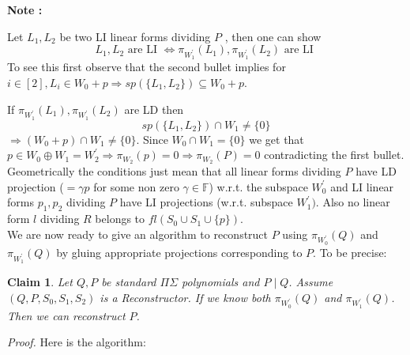 \documentclass[letterpaper,USenglish,numberwithinsect]{lipics}
\newcommand{\F}{\mathbb{F}}
\newtheorem{claim}[theorem]{Claim}
\begin{document}
{\bf Note :}

 Let $L_1,L_2$  be two LI linear forms dividing $P$ , then one can show
 \[
 L_1,L_2 \text{ are LI } \Leftrightarrow \pi_{W_1^\prime}(L_1),
\pi_{W_1^\prime}(L_2) \text{ are LI }
 \]
 To see this first observe that the second bullet implies for $i\in [2], L_i\in W_0 + p \Rightarrow
sp(\{L_1,L_2\})\subseteq W_0+p$.

 If $\pi_{W_1^\prime}(L_1), \pi_{W_1^\prime}(L_2)$ are LD then
 \[
 sp(\{L_1,L_2\}) \cap W_1 \neq \{0\}
  \]
 $\Rightarrow (W_0+p) \cap W_1 \neq \{0\}$. Since $W_0\cap W_1 = \{0\}$ we get
that $p\in W_0\oplus W_1 = W_2^\prime
 \Rightarrow \pi_{W_2}(p)=0\Rightarrow \pi_{W_2}(P)=0$ contradicting the first
bullet.\\

 Geometrically the conditions just mean that all linear forms dividing $P$ have
LD projection ($=\gamma p$ for some non zero $\gamma \in \F$) w.r.t.
the subspace $W_0^\prime$ and LI linear forms $p_1,p_2$ dividing $P$  have LI
projections (w.r.t. subspace $W_1^\prime)$. Also no linear form $l$ dividing $R$
belongs to $fl(S_0 \cup S_1 \cup \{p\})$.\\

 We are now ready to give an algorithm to reconstruct $P$ using $\pi_{W_0^\prime}(Q)$ and
 $\pi_{W_1^\prime}(Q)$ by gluing appropriate projections corresponding to $P$.
To be precise:\\


\begin{claim} \label{reconalgoclaim}
 Let $Q,P$ be standard $\Pi\Sigma$ polynomials and $P\mid Q$. Assume $(Q, P,S_0,S_1,S_2)$ is
a \emph{Reconstructor}. If we know both $\pi_{W_0^\prime}(Q)$ and
$\pi_{W_1^\prime}(Q)$. Then we can reconstruct $P$.
\end{claim}

\emph{Proof.} Here is the algorithm:
\end{document}
